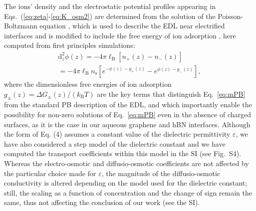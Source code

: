 \documentclass[journal=ancac3,manuscript=article,layout=twocolumn]{achemso}
\newcommand{\kt}{k_\text{B}T}
\newcommand{\lB}{\ell_\text{B}}
\newcommand{\ns}{n_\text{s}}
\begin{document}
The ions' density and the  electrostatic potential profiles
appearing in Eqs.~(\ref{eq:zeta}-\ref{eq:K_osm2})
are determined from the solution of the
Poisson-Boltzmann equation \cite{Hunter2001,Schoch2008},
which is used to describe the EDL near
electrified interfaces and is modified to include
the free energy of ion adsorption \cite{schwierz2010reversed,luo2006ion},
here computed from first principles simulations:
\begin{multline}\label{eq:mPB}
    \mathrm{d}^2_z \phi(z) = - 4 \pi \lB \left[ n_+(z) - n_-(z) \right] \\
    =- 4 \pi \lB  \ns \left[ e^{-\phi(z) - g_+ (z)} - e^{ \phi(z) - g_- (z) } \right],
\end{multline}
where the dimensionless free energies of ion adsorption
$g_{\pm}(z)= \Delta G_{\pm}(z) /(\kt)$ are the key terms that distinguish
Eq.~\eqref{eq:mPB} from the standard PB description of the EDL,
and which importantly enable the possibility for non-zero solutions of Eq.~\eqref{eq:mPB} even in the absence of charged surfaces,
as it is the case in our
aqueous graphene and hBN interfaces.
Although
the form of Eq. (4) assumes a constant value
of the dielectric permittivity $\varepsilon$, we have also
considered a step model of
the dielectric constant\cite{schwierz2010reversed,huang2007ion} and we have computed the transport coefficients within this model in the SI (see Fig.~S4).
%
Whereas the electro-osmotic
and diffusio-osmotic coefficients are
not affected by the particular choice
made for $\varepsilon$, the
magnitude of the diffusio-osmotic
conductivity is altered depending
on the  model used for the dielectric constant;
still, the scaling as a function of concentration  and the change of sign remain the same, thus not
affecting the conclusion of our work (see the SI).
\end{document}
